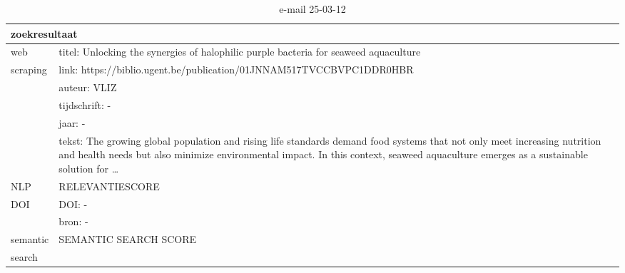 \begin{table}[h!]
    \caption{e-mail 25-03-12}
    \centering
    \begin{tabularx}{\textwidth}{|p{4cm}|X|} 
        \hline
        \multicolumn{2}{|X|}{\textbf{zoekresultaat}} \\
        \hline
        web &titel: Unlocking the synergies of halophilic purple bacteria for seaweed aquaculture\\
        scraping&link: https://biblio.ugent.be/publication/01JNNAM517TVCCBVPC1DDR0HBR\\
        &auteur: VLIZ\\
        &tijdschrift: -\\
        &jaar: -\\
        &tekst: The growing global population and rising life standards demand food systems that not only meet increasing nutrition and health needs but also minimize environmental impact. In this context, seaweed aquaculture emerges as a sustainable solution for …\\
        \hline
        NLP&RELEVANTIESCORE\\
        \hline
        DOI&DOI: -\\
        &bron: -\\
        \hline
        semantic&SEMANTIC SEARCH SCORE\\
        search&\\
        \hline
    \end{tabularx}
    \label{table:email20250312}
\end{table}
